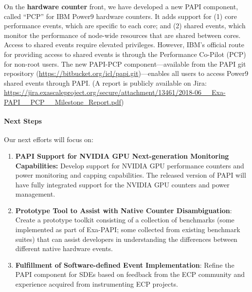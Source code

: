 \vspace{10pt}
On the \textbf{hardware counter} front, we have developed a new PAPI component, called ``PCP'' for 
IBM Power9 hardware counters. It adds support for (1) core performance events, which are specific
to each core; and (2) shared events, which monitor the performance of
node-wide resources that are shared between cores. Access to shared
events require elevated privileges. However, IBM's official route for providing
access to shared events is through the Performance Co-Pilot (PCP) for non-root users.
The new PAPI-PCP component---available from the PAPI git repository (\url{https://bitbucket.org/icl/papi.git})---enables 
all users to access Power9 shared events through PAPI.
(A report is publicly available on Jira:
\url{https://jira.exascaleproject.org/secure/attachment/13461/2018-06__Exa-PAPI__PCP__Milestone_Report.pdf})

\paragraph{Next Steps}

Our next efforts will focus on:
\begin{enumerate}
\item \textbf{PAPI Support for NVIDIA GPU Next-generation Monitoring Capabilities:} 
		Develop support for NVIDIA GPU performance counters and power 
		monitoring and capping capabilities. The released version of PAPI 
		will have fully integrated support for the NVIDIA GPU counters and power management.
%
\item \textbf{Prototype Tool to Assist with Native Counter Disambiguation}: 
		Create a prototype toolkit consisting of a collection of benchmarks 
		(some implemented as part of Exa-PAPI; some collected from existing 
		benchmark suites) that can assist developers in understanding the differences 
		between different native hardware events.
%
\item \textbf{Fulfillment of Software-defined Event Implementation}:
		Refine the PAPI component for SDEs based on feedback from the ECP community 
		and experience acquired from instrumenting ECP projects.
\end{enumerate}
